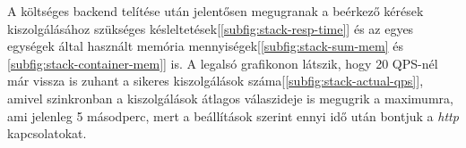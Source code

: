 A költséges backend telítése után jelentősen megugranak a beérkező kérések kiszolgálásához szükséges késleltetések[\ref{subfig:stack-resp-time}] és az egyes egységek által használt memória mennyiségek[\ref{subfig:stack-sum-mem} és \ref{subfig:stack-container-mem}] is.
A legalsó grafikonon látszik, hogy 20 QPS-nél már vissza is zuhant a sikeres kiszolgálások száma[\ref{subfig:stack-actual-qps}], amivel szinkronban a kiszolgálások átlagos válaszideje is megugrik a maximumra, ami jelenleg 5 másodperc, mert a beállítások szerint ennyi idő után bontjuk a \textit{http} kapcsolatokat.



